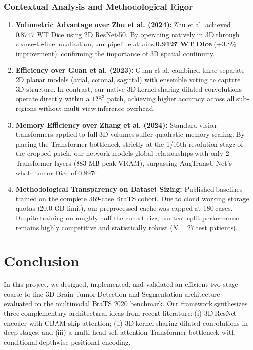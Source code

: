\documentclass[12pt, a4paper]{article}
\begin{document}
\subsubsection{Contextual Analysis and Methodological Rigor}
\begin{enumerate}[leftmargin=*, itemsep=4pt]
    \item \textbf{Volumetric Advantage over Zhu et al. (2024):} Zhu et al. achieved 0.8747 WT Dice using 2D ResNet-50. By operating natively in 3D through coarse-to-fine localization, our pipeline attains \textbf{0.9127 WT Dice} (+3.8\% improvement), confirming the importance of 3D spatial continuity.
    \item \textbf{Efficiency over Guan et al. (2023):} Guan et al. combined three separate 2D planar models (axial, coronal, sagittal) with ensemble voting to capture 3D structure. In contrast, our native 3D kernel-sharing dilated convolutions operate directly within a $128^3$ patch, achieving higher accuracy across all sub-regions without multi-view inference overhead.
    \item \textbf{Memory Efficiency over Zhang et al. (2024):} Standard vision transformers applied to full 3D volumes suffer quadratic memory scaling. By placing the Transformer bottleneck strictly at the 1/16th resolution stage of the cropped patch, our network models global relationships with only 2 Transformer layers (883 MB peak VRAM), surpassing AugTransU-Net's whole-tumor Dice of 0.8970.
    \item \textbf{Methodological Transparency on Dataset Sizing:} Published baselines trained on the complete 369-case BraTS cohort. Due to cloud working storage quotas (20.0 GB limit), our preprocessed cache was capped at 180 cases. Despite training on roughly half the cohort size, our test-split performance remains highly competitive and statistically robust ($N=27$ test patients).
\end{enumerate}

\section{Conclusion}

In this project, we designed, implemented, and validated an efficient two-stage coarse-to-fine 3D Brain Tumor Detection and Segmentation architecture evaluated on the multimodal BraTS 2020 benchmark. Our framework synthesizes three complementary architectural ideas from recent literature: (i) 3D ResNet encoder with CBAM skip attention; (ii) 3D kernel-sharing dilated convolutions in deep stages; and (iii) a multi-head self-attention Transformer bottleneck with conditional depthwise positional encoding.
\end{document}
